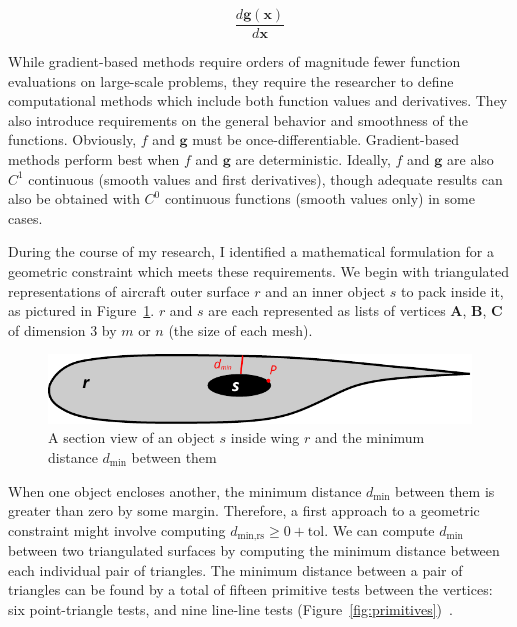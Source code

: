 \documentclass[11pt,letterpaper]{article}
\begin{document}
\begin{equation}
    \frac{d\textbf{g}(\textbf{x})}{d\textbf{x}}
\end{equation}

\qquad While gradient-based methods require orders of magnitude fewer function evaluations on large-scale problems, they require the researcher to define computational methods which include both function values and derivatives.
They also introduce requirements on the general behavior and smoothness of the functions.
Obviously, $f$ and $\textbf{g}$ must be once-differentiable.
Gradient-based methods perform best when $f$ and $\textbf{g}$ are deterministic.
Ideally, $f$ and $\textbf{g}$ are also $C^1$ continuous (smooth values and first derivatives), though adequate results can also be obtained with $C^0$ continuous functions (smooth values only) in some cases.

\qquad During the course of my research, I identified a mathematical formulation for a geometric constraint which meets these requirements.
We begin with triangulated representations of aircraft outer surface $r$ and an inner object $s$ to pack inside it, as pictured in Figure~\ref{fig:schematic}.
$r$ and $s$ are each represented as lists of vertices $\textbf{A}$, $\textbf{B}$, $\textbf{C}$ of dimension 3 by $m$ or $n$ (the size of each mesh).

\begin{figure}[ht]
  \centering
  \includegraphics[width=0.63\linewidth]{figures/schematic}
  \caption{A section view of an object $s$ inside wing $r$ and the minimum distance $d_\text{min}$ between them}
  \label{fig:schematic}
\end{figure}

\qquad When one object encloses another, the minimum distance $d_\text{min}$ between them is greater than zero by some margin.
Therefore, a first approach to a geometric constraint might involve computing $d_\text{min,rs} \geq 0 + \text{tol}$.
We can compute $d_\text{min}$ between two triangulated surfaces by computing the minimum distance between each individual pair of triangles.
The minimum distance between a pair of triangles can be found by a total of fifteen primitive tests between the vertices: six point-triangle tests, and nine line-line tests (Figure~\ref{fig:primitives})~\cite{Ericson:2004:RCD:1121584}.
\end{document}
